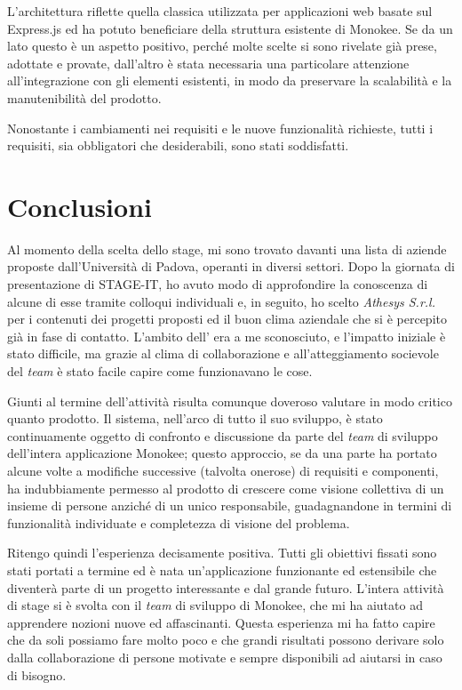 L'architettura riflette quella classica utilizzata per applicazioni web basate sul  Express.js ed ha potuto beneficiare della struttura esistente di Monokee. Se da un lato questo è un aspetto positivo, perché molte scelte si sono rivelate già prese, adottate e provate, dall'altro è stata necessaria una particolare attenzione all'integrazione con gli elementi esistenti, in modo da preservare la scalabilità e la manutenibilità del prodotto. 

Nonostante i cambiamenti nei requisiti e le nuove funzionalità richieste, tutti i requisiti, sia obbligatori che desiderabili, sono stati soddisfatti. 

\section{Conclusioni}
Al momento della scelta dello stage, mi sono trovato davanti una lista di aziende proposte dall'Università di Padova, operanti in diversi settori. Dopo la giornata di presentazione di STAGE-IT, ho avuto modo di approfondire la conoscenza di alcune di esse tramite colloqui individuali e, in seguito, ho scelto \textit{Athesys S.r.l.} per i contenuti dei progetti proposti ed il buon clima aziendale che si è percepito già in fase di contatto. L'ambito dell' era a me sconosciuto, e l'impatto iniziale è stato difficile, ma grazie al clima di collaborazione e all'atteggiamento socievole del \textit{team} è stato facile capire come funzionavano le cose.

Giunti al termine dell'attività risulta comunque doveroso valutare in modo critico quanto prodotto. Il sistema, nell'arco di tutto il suo sviluppo, è stato continuamente oggetto di confronto e discussione da parte del \textit{team} di sviluppo dell'intera applicazione Monokee; questo approccio, se da una parte ha portato alcune volte a modifiche successive (talvolta onerose) di requisiti e componenti, ha indubbiamente permesso al prodotto di crescere come visione collettiva di un insieme di persone anziché di un unico responsabile, guadagnandone in termini di funzionalità individuate e completezza di visione del problema.

Ritengo quindi l'esperienza decisamente positiva. Tutti gli obiettivi fissati sono stati portati a termine ed è nata un'applicazione funzionante ed estensibile che diventerà parte di un progetto interessante e dal grande futuro. L'intera attività di stage si è svolta con il \textit{team} di sviluppo di Monokee, che mi ha aiutato ad apprendere nozioni nuove ed affascinanti. Questa esperienza mi ha fatto capire che da soli possiamo fare molto poco e che grandi risultati possono derivare solo dalla collaborazione di persone motivate e sempre disponibili ad aiutarsi in caso di bisogno.

